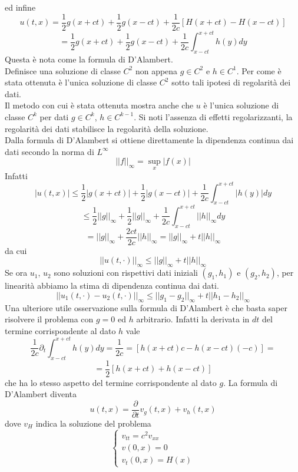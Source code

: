 ed infine
\[
	u(t,x)= \frac{1}{2}g(x+ct)+ \frac{1}{2}g(x-ct)+\frac{1}{2c}
	[H(x+ct)-H(x-ct)]
\]
\[
	= \frac{1}{2}g(x+ct)+ \frac{1}{2}g(x-ct)+\frac{1}{2c}
	\int_{x-ct}^{x+ct} h(y)dy
\]
Questa \`e nota come la formula di D'Alambert.\\
Definisce una soluzione di classe $C^2$ non appena $g \in C^2$ e $h \in C^1$.
Per come \`e stata ottenuta \`e l'unica soluzione di classe $C^2$ sotto tali
ipotesi di regolarit\`a dei dati.\\
Il metodo con cui \`e stata ottenuta mostra anche che $u$ \`e l'unica soluzione
di classe $C^k$ per dati $g \in C^k$, $h \in C^{k-1}$. Si noti l'assenza di
effetti regolarizzanti, la regolarit\`a dei dati stabilisce la regolarit\`a
della soluzione.\\
Dalla formula di D'Alambert si ottiene direttamente la dipendenza continua dai
dati secondo la norma di $L^{\infty}$
\[
	||f||_{\infty}= \sup_x|f(x)|
\]
Infatti
\[
	|u(t,x)| \leq \frac{1}{2}|g(x+ct)| + \frac{1}{2}|g(x-ct)|+
	\frac{1}{2c}\int_{x-ct}^{x+ct} |h(y)| dy
\]
\[
	\leq \frac{1}{2}||g||_\infty + \frac{1}{2}||g||_\infty+
	\frac{1}{2c}\int_{x-ct}^{x+ct} ||h||_\infty dy
\]
\[
	= ||g||_\infty + \frac{2ct}{2c}||h||_\infty= ||g||_\infty +
	t ||h||_\infty
\]
da cui
\[
	||u(t, \cdot)||_\infty \leq ||g||_\infty + t||h||_\infty
\]
Se ora $u_1$, $u_2$ sono soluzioni con rispettivi dati iniziali $(g_1,h_1)$ e
$(g_2,h_2)$, per linearit\`a abbiamo la stima di dipendenza continua dai dati.
\[
	||u_1(t, \cdot) - u_2(t, \cdot)||_\infty
	\leq ||g_1 -g_2||_\infty + t||h_1-h_2||_\infty
\]
Una ulteriore utile osservazione sulla formula di D'Alambert \`e che basta
saper risolvere il problema con $g=0$ ed $h$ arbitrario. Infatti la derivata in
$dt$ del termine corrispondente al dato $h$ vale
\[
	\frac{1}{2c}\partial_t \int_{x-ct}^{x+ct} h(y)dy=
	\frac{1}{2c}= [h(x+ct)c - h(x-ct)(-c)]=
\]
\[
	=\frac{1}{2} [h(x+ct) + h(x-ct)]
\]
che ha lo stesso aspetto del termine corrispondente al dato $g$. La formula di
D'Alambert diventa
\[
	u(t,x)= \frac{\partial}{\partial t}v_g(t,x)+ v_h(t,x)
\]
dove $v_H$ indica la soluzione del problema
\[
	\begin{cases}
		v_{tt}= c^2 v_{xx}\\
		v(0,x)= 0 \\
		v_t(0,x)= H(x)
	\end{cases}
\]

